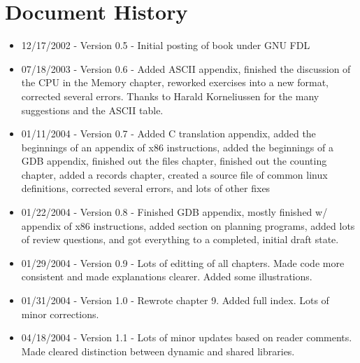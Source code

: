 \chapter{Document History}

% 
% 
% 
% 

\begin{itemize}\item 12/17/2002 - Version 0.5 - Initial posting of book under GNU FDL 
\item 07/18/2003 - Version 0.6 - Added ASCII appendix, finished the discussion of the CPU in the Memory chapter, reworked exercises into a new format, corrected several errors.  Thanks to Harald Korneliussen for the many suggestions and the ASCII table. 
\item 01/11/2004 - Version 0.7 - Added C translation appendix, added the beginnings of an appendix of x86 instructions, added the beginnings of a GDB appendix, finished out the files chapter, finished out the counting chapter, added a records chapter, created a source file of common linux definitions, corrected several errors, and lots of other fixes 
\item 01/22/2004 - Version 0.8 - Finished GDB appendix, mostly finished w/ appendix of x86 instructions, added section on planning programs, added lots of review questions, and got everything to a completed, initial draft state. 
\item 01/29/2004 - Version 0.9 - Lots of editting of all chapters.  Made code more consistent and made explanations clearer.  Added some illustrations. 
\item 01/31/2004 - Version 1.0 - Rewrote chapter 9.  Added full index.  Lots of minor corrections. 
\item 04/18/2004 - Version 1.1 - Lots of minor updates based on reader comments.  Made cleared distinction between dynamic and shared libraries. 
\end{itemize}

